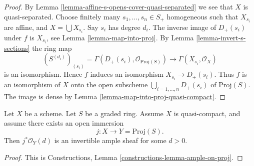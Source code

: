 \begin{proof}
By Lemma \ref{lemma-affine-s-opens-cover-quasi-separated} we see
that $X$ is quasi-separated. Choose finitely many
$s_1, \ldots, s_n \in S_{+}$ homogeneous
such that $X_{s_i}$ are affine, and $X = \bigcup X_{s_i}$.
Say $s_i$ has degree $d_i$. The inverse image of
$D_{+}(s_i)$ under $f$ is $X_{s_i}$, see Lemma \ref{lemma-map-into-proj}.
By Lemma \ref{lemma-invert-s-sections} the ring map
$$
(S^{(d_i)})_{(s_i)} = \Gamma(D_{+}(s_i), \mathcal{O}_{\text{Proj}(S)})
\longrightarrow
\Gamma(X_{s_i}, \mathcal{O}_X)
$$
is an isomorphism. Hence $f$ induces an isomorphism
$X_{s_i} \to D_{+}(s_i)$. Thus $f$ is an isomorphism of $X$ onto the open
subscheme $\bigcup_{i = 1, \ldots, n} D_{+}(s_i)$ of $\text{Proj}(S)$.
The image is dense by Lemma \ref{lemma-map-into-proj-quasi-compact}.
\end{proof}

\begin{lemma}
\label{lemma-open-in-proj-ample}
Let $X$ be a scheme.
Let $S$ be a graded ring. Assume $X$ is quasi-compact,
and assume there exists an open immersion
$$
j : X \longrightarrow Y = \text{Proj}(S).
$$
Then $j^*\mathcal{O}_Y(d)$ is an invertible ample sheaf
for some $d > 0$.
\end{lemma}

\begin{proof}
This is Constructions, Lemma \ref{constructions-lemma-ample-on-proj}.
\end{proof}

